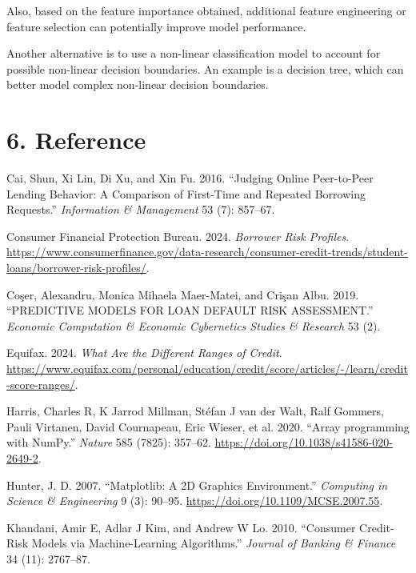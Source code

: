 \documentclass[
  letterpaper,
  DIV=11,
  numbers=noendperiod]{scrartcl}
\newlength{\cslhangindent}
\newenvironment{CSLReferences}[2] %
 {\begin{list}{}{%
  \setlength{\itemindent}{0pt}
  \setlength{\leftmargin}{0pt}
  \setlength{\parsep}{0pt}
  \ifodd #1
   \setlength{\leftmargin}{\cslhangindent}
   \setlength{\itemindent}{-1\cslhangindent}
  \fi
  \setlength{\itemsep}{#2\baselineskip}}}
 {\end{list}}
\begin{document}
Also, based on the feature importance obtained, additional feature
engineering or feature selection can potentially improve model
performance.

Another alternative is to use a non-linear classification model to
account for possible non-linear decision boundaries. An example is a
decision tree, which can better model complex non-linear decision
boundaries.

\section*{6. Reference}\label{reference}

\label{refs}
\begin{CSLReferences}{1}{0}
Cai, Shun, Xi Lin, Di Xu, and Xin Fu. 2016. {``Judging Online
Peer-to-Peer Lending Behavior: A Comparison of First-Time and Repeated
Borrowing Requests.''} \emph{Information \& Management} 53 (7): 857--67.

Consumer Financial Protection Bureau. 2024. \emph{Borrower Risk
Profiles}.
\url{https://www.consumerfinance.gov/data-research/consumer-credit-trends/student-loans/borrower-risk-profiles/}.

Coşer, Alexandru, Monica Mihaela Maer-Matei, and Crişan Albu. 2019.
{``PREDICTIVE MODELS FOR LOAN DEFAULT RISK ASSESSMENT.''} \emph{Economic
Computation \& Economic Cybernetics Studies \& Research} 53 (2).

Equifax. 2024. \emph{What Are the Different Ranges of Credit}.
\url{https://www.equifax.com/personal/education/credit/score/articles/-/learn/credit-score-ranges/}.

Harris, Charles R, K Jarrod Millman, Stéfan J van der Walt, Ralf
Gommers, Pauli Virtanen, David Cournapeau, Eric Wieser, et al. 2020.
{``{Array programming with NumPy}.''} \emph{Nature} 585 (7825): 357--62.
\url{https://doi.org/10.1038/s41586-020-2649-2}.

Hunter, J. D. 2007. {``Matplotlib: A 2D Graphics Environment.''}
\emph{Computing in Science \& Engineering} 9 (3): 90--95.
\url{https://doi.org/10.1109/MCSE.2007.55}.

Khandani, Amir E, Adlar J Kim, and Andrew W Lo. 2010. {``Consumer
Credit-Risk Models via Machine-Learning Algorithms.''} \emph{Journal of
Banking \& Finance} 34 (11): 2767--87.


\end{CSLReferences}
\end{document}
